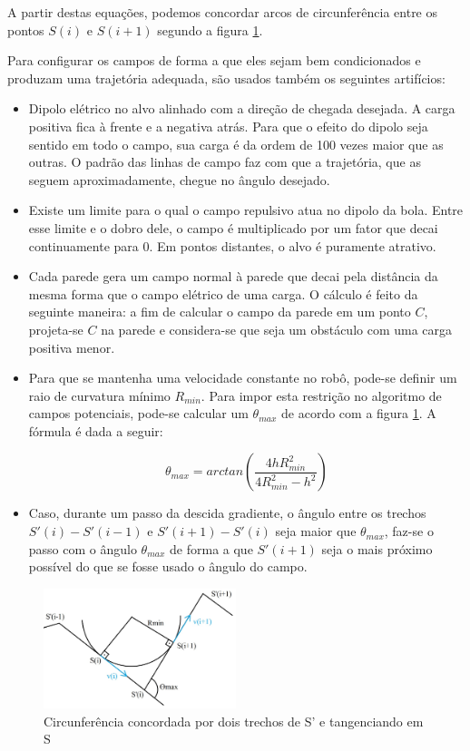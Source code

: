 \documentclass[a4paper,12pt]{article}
\begin{document}
A partir destas equações, podemos concordar arcos de circunferência entre os pontos $S(i)$ e $S(i+1)$ segundo a figura \ref{fig: concordancia}.

Para configurar os campos de forma a que eles sejam bem condicionados e produzam uma trajetória adequada, são usados também os seguintes artifícios:

\begin{itemize}
\item Dipolo elétrico no alvo alinhado com a direção de chegada desejada. A carga positiva fica à frente e a negativa atrás. Para que o efeito do dipolo seja sentido em todo o campo, sua carga é da ordem de 100 vezes maior que as outras. O padrão das linhas de campo faz com que a trajetória, que as seguem aproximadamente, chegue no ângulo desejado.
\item Existe um limite para o qual o campo repulsivo atua no dipolo da bola. Entre esse limite e o dobro dele, o campo é multiplicado por um fator que decai continuamente para 0. Em pontos distantes, o alvo é puramente atrativo.
\item Cada parede gera um campo normal à parede que decai pela distância da mesma forma que o campo elétrico de uma carga. O cálculo é feito da seguinte maneira: a fim de calcular o campo da parede em um ponto $C$, projeta-se $C$ na parede e considera-se que seja um obstáculo com uma carga positiva menor.
\item Para que se mantenha uma velocidade constante no robô, pode-se definir um raio de curvatura mínimo $R_{min}$. Para impor esta restrição no algoritmo de campos potenciais, pode-se calcular um $\theta_{max}$ de acordo com a figura \ref{fig: concordancia}. A fórmula é dada a seguir:

\begin{equation}
\theta_{max} = arctan(\frac{4hR_{min}^2}{4R_{min}^2 - h^2})
\end{equation}

\item Caso, durante um passo da descida gradiente, o ângulo entre os trechos $S'(i) - S'(i-1)$ e $S'(i+1) - S'(i)$ seja maior que $\theta_{max}$, faz-se o passo com o ângulo $\theta_{max}$ de forma a que $S'(i+1)$ seja o mais próximo possível do que se fosse usado o ângulo do campo.
\end{itemize}

\begin{figure}
	\label{fig: concordancia}
	\centering
	\includegraphics[width=0.5\textwidth]{figures/thetamax.jpg}
   \caption{Circunferência concordada por dois trechos de S' e tangenciando em S}
\end{figure}
\end{document}
